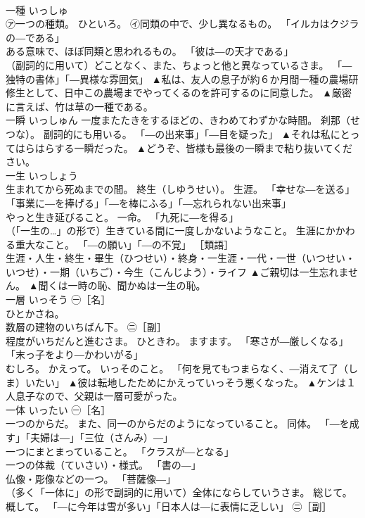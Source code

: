 \documentclass[8pt]{extreport}
\begin{document}
\begin{CJK}{UTF8}{min}
\\	一種	いっしゅ	
\\	㋐一つの種類。 ひといろ。 ㋑同類の中で、少し異なるもの。 「イルカはクジラの―である」 
\\	ある意味で、ほぼ同類と思われるもの。 「彼は―の天才である」 
\\	（副詞的に用いて）どことなく、また、ちょっと他と異なっているさま。 「―独特の書体」「―異様な雰囲気」	▲私は、友人の息子が約６か月間一種の農場研修生として、日中この農場までやってくるのを許可するのに同意した。 ▲厳密に言えば、竹は草の一種である。
\\	一瞬	いっしゅん	一度またたきをするほどの、きわめてわずかな時間。 刹那（せつな）。 副詞的にも用いる。 「―の出来事」「―目を疑った」	▲それは私にとってはらはらする一瞬だった。 ▲どうぞ、皆様も最後の一瞬まで粘り抜いてください。
\\	一生	いっしょう	
\\	生まれてから死ぬまでの間。 終生（しゆうせい）。 生涯。 「幸せな―を送る」「事業に―を捧げる」「―を棒にふる」「―忘れられない出来事」 
\\	やっと生き延びること。 一命。 「九死に―を得る」 
\\	（「一生の…」の形で）生きている間に一度しかないようなこと。 生涯にかかわる重大なこと。 「―の願い」「―の不覚」 ［類語］
\\	生涯・人生・終生・畢生（ひつせい）・終身・一生涯・一代・一世（いつせい・いつせ）・一期（いちご）・今生（こんじよう）・ライフ	▲ご親切は一生忘れません。 ▲聞くは一時の恥、聞かぬは一生の恥。
\\	一層	いっそう	㊀［名］ 
\\	ひとかさね。 
\\	数層の建物のいちばん下。 ㊁［副］ 
\\	程度がいちだんと進むさま。 ひときわ。 ますます。 「寒さが―厳しくなる」「末っ子をより―かわいがる」 
\\	むしろ。 かえって。 いっそのこと。 「何を見てもつまらなく、―消えて了（しま）いたい」	▲彼は転地したためにかえっていっそう悪くなった。 ▲ケンは１人息子なので、父親は一層可愛がった。
\\	一体	いったい	㊀［名］ 
\\	一つのからだ。 また、同一のからだのようになっていること。 同体。 「―を成す」「夫婦は―」「三位（さんみ）―」 
\\	一つにまとまっていること。 「クラスが―となる」 
\\	一つの体裁（ていさい）・様式。 「書の―」 
\\	仏像・彫像などの一つ。 「菩薩像―」 
\\	（多く「一体に」の形で副詞的に用いて）全体にならしていうさま。 総じて。 概して。 「―に今年は雪が多い」「日本人は―に表情に乏しい」 ㊁［副］ 

\end{CJK}
\end{document}
